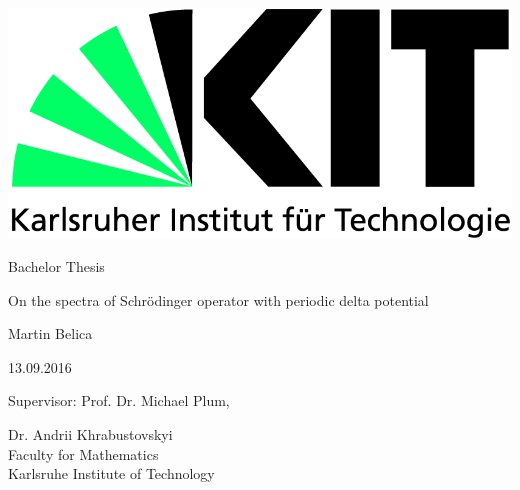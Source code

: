 \pagestyle{empty}
\begin{titlepage}

  \includegraphics[scale=0.45]{kit-logo.jpg}
  \vspace*{2cm} 

  \begin{center} \large 
    
    Bachelor Thesis
    \vspace*{2cm}

    {\huge On the spectra of Schrödinger operator with periodic delta potential}
    \vspace*{2.5cm}

    Martin Belica
    \vspace*{0.125cm}

    13.09.2016
    \vspace*{4.25cm}


    Supervisor: Prof. Dr. Michael Plum,
    \vspace*{0.125cm}
    
    Dr. Andrii Khrabustovskyi \\[1cm]
    Faculty for Mathematics \\[1cm]
	Karlsruhe Institute of Technology
  \end{center}
\end{titlepage}